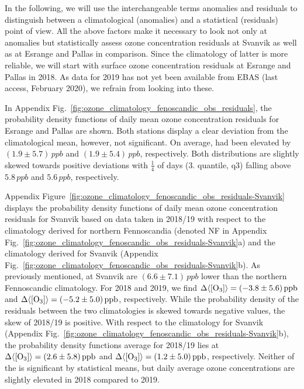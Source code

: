 \documentclass[bg, manuscript]{copernicus}
\begin{document}
In the following, we will use the interchangeable terms anomalies and residuals to distinguish between a climatological (anomalies) and a statistical (residuals) point of view.
All the above factors make it necessary to look not only at anomalies but statistically assess ozone concentration residuals at Svanvik as well as at Esrange and Pallas in comparison. Since the climatology of latter is more reliable, we will start with surface ozone concentration residuals \chem{\Delta[O_3]} at Esrange and Pallas in 2018. As data for 2019 has not yet been available from EBAS (last access, February 2020), we refrain from looking into these.

In Appendix Fig.~\ref{fig:ozone_climatology_fenoscandic_obs_residuals}, the probability density functions of daily mean ozone concentration residuals for Esrange and Pallas are shown. Both stations display a clear deviation from the climatological mean, however, not significant. On average, \chem{[O_3]} had been elevated by $(1.9\pm 5.7)\,\unit{ppb}$ and $(1.9\pm 5.4)\,\unit{ppb}$, respectively. Both distributions are slightly skewed towards positive deviations with $\frac{1}{4}$ of days (3. quantile, q3) falling above $5.8\,\unit{ppb}$ and $5.6\,\unit{ppb}$, respectively.

Appendix Figure~\ref{fig:ozone_climatology_fenoscandic_obs_residuals-Svanvik} displays the probability density functions of daily mean ozone concentration residuals for Svanvik based on data taken in 2018/19 with respect to the climatology derived for northern Fennoscandia (denoted NF in Appendix Fig.~\ref{fig:ozone_climatology_fenoscandic_obs_residuals-Svanvik}a) and the climatology derived for Svanvik (Appendix Fig.~\ref{fig:ozone_climatology_fenoscandic_obs_residuals-Svanvik}b).
As previously mentioned, \chem{\left<[O_3]\right>} at Svanvik are $(6.6\pm 7.1)\,\unit{ppb}$ lower than the northern Fennoscandic climatology. For 2018 and 2019, we find $\Delta\chem{\left<[O_3]\right>} = (-3.8\pm 5.6)\,\unit{ppb}$ and $\Delta\chem{\left<[O_3]\right>} = (-5.2\pm 5.0)\,\unit{ppb}$, respectively. While the probability density of the residuals between the two climatologies is skewed towards negative values, the skew of 2018/19 is positive.
With respect to the climatology for Svanvik (Appendix Fig.~\ref{fig:ozone_climatology_fenoscandic_obs_residuals-Svanvik}b), the probability density functions average for 2018/19 lies at $\Delta\chem{\left<[O_3]\right>} = (2.6\pm 5.8)\,\unit{ppb}$ and $\Delta\chem{\left<[O_3]\right>} = (1.2\pm 5.0)\,\unit{ppb}$, respectively.
Neither of the \chem{\Delta\left<[O_3]\right>} is significant by statistical means, but daily average ozone concentrations are slightly elevated in 2018 compared to 2019.
\end{document}

